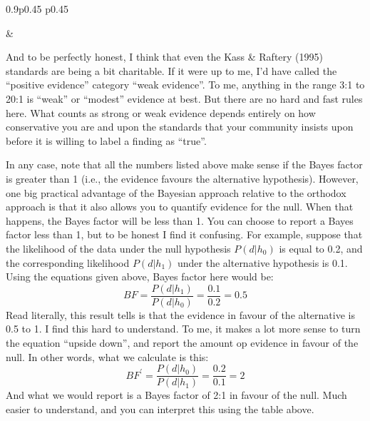 \documentclass[
  a4paper,
]{book}
\begin{document}
\begin{table}[ht]
\begin{centerbox}
\begin{threeparttable}
\begin{tabularx}{0.9\textwidth}{p{} p{}}
\hhline{}

 &
 \tabularnewline[-0.5pt]


\end{tabularx} 

\end{threeparttable}\par\end{centerbox}

\end{table}
 

And to be perfectly honest, I think that even the Kass \& Raftery (1995)
standards are being a bit charitable. If it were up to me, I'd have
called the ``positive evidence'' category ``weak evidence''. To me,
anything in the range 3:1 to 20:1 is ``weak'' or ``modest'' evidence at
best. But there are no hard and fast rules here. What counts as strong
or weak evidence depends entirely on how conservative you are and upon
the standards that your community insists upon before it is willing to
label a finding as ``true''.

In any case, note that all the numbers listed above make sense if the
Bayes factor is greater than 1 (i.e., the evidence favours the
alternative hypothesis). However, one big practical advantage of the
Bayesian approach relative to the orthodox approach is that it also
allows you to quantify evidence for the null. When that happens, the
Bayes factor will be less than 1. You can choose to report a Bayes
factor less than 1, but to be honest I find it confusing. For example,
suppose that the likelihood of the data under the null hypothesis
\(P(d|h_0)\) is equal to 0.2, and the corresponding likelihood
\(P(d|h_1)\) under the alternative hypothesis is 0.1. Using the
equations given above, Bayes factor here would be:
\[BF=\frac{P(d|h_1)}{P(d|h_0)}=\frac{0.1}{0.2}=0.5\] Read literally,
this result tells is that the evidence in favour of the alternative is
0.5 to 1. I find this hard to understand. To me, it makes a lot more
sense to turn the equation ``upside down'', and report the amount op
evidence in favour of the null. In other words, what we calculate is
this: \[BF^{'}=\frac{P(d|h_0)}{P(d|h_1)}=\frac{0.2}{0.1}=2\] And what we
would report is a Bayes factor of 2:1 in favour of the null. Much easier
to understand, and you can interpret this using the table above.
\end{document}
